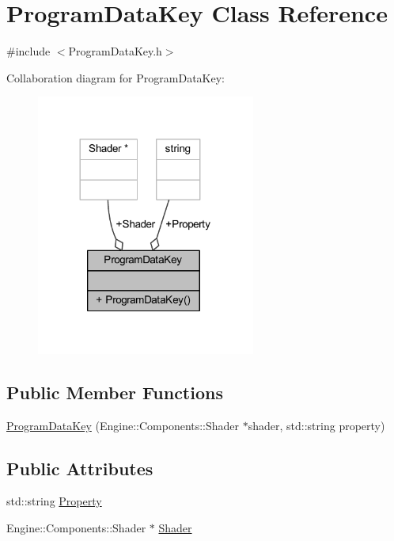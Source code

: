 \hypertarget{classProgramDataKey}{}\section{Program\+Data\+Key Class Reference}
\label{classProgramDataKey}


{\ttfamily \#include $<$Program\+Data\+Key.\+h$>$}



Collaboration diagram for Program\+Data\+Key\+:
\nopagebreak
\begin{figure}[H]
\begin{center}
\leavevmode
\includegraphics[width=204pt]{classProgramDataKey__coll__graph}
\end{center}
\end{figure}
\subsection*{Public Member Functions}
\begin{DoxyCompactItemize}
\item 
\mbox{\hyperlink{classProgramDataKey_ab2378434a42d81c34f97912197ad9a8d}{Program\+Data\+Key}} (Engine\+::\+Components\+::\+Shader $\ast$shader, std\+::string property)
\end{DoxyCompactItemize}
\subsection*{Public Attributes}
\begin{DoxyCompactItemize}
\item 
std\+::string \mbox{\hyperlink{classProgramDataKey_a34706c7a5f763c8ecb8b5b1d70b41226}{Property}}
\item 
Engine\+::\+Components\+::\+Shader $\ast$ \mbox{\hyperlink{classProgramDataKey_ac8797a9070abe91cea6ad8615d60fa90}{Shader}}
\end{DoxyCompactItemize}



